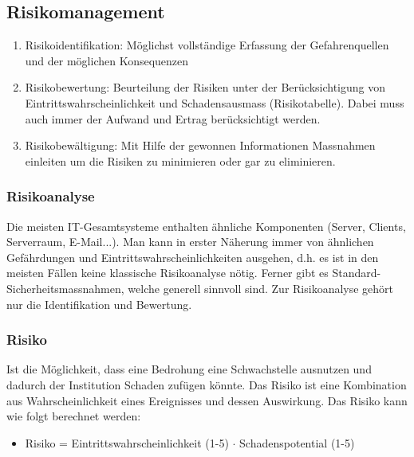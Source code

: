 \subsection{Risikomanagement}
\begin{enumerate}
	\item Risikoidentifikation: Möglichst vollständige Erfassung der Gefahrenquellen und der möglichen Konsequenzen
	\item Risikobewertung: Beurteilung der Risiken unter der Berücksichtigung von Eintrittswahrscheinlichkeit und Schadensausmass (Risikotabelle). Dabei muss auch immer der Aufwand und Ertrag berücksichtigt werden.
	\item Risikobewältigung: Mit Hilfe der gewonnen Informationen Massnahmen einleiten um die Risiken zu minimieren oder gar zu eliminieren.
\end{enumerate}

\subsubsection{Risikoanalyse}
Die meisten IT-Gesamtsysteme enthalten ähnliche Komponenten (Server, Clients, Serverraum, E-Mail...). Man kann in erster Näherung immer von ähnlichen Gefährdungen und Eintrittswahrscheinlichkeiten ausgehen, d.h. es ist in den meisten Fällen keine klassische Risikoanalyse nötig. Ferner gibt es Standard-Sicherheitsmassnahmen, welche generell sinnvoll sind. Zur Risikoanalyse gehört nur die Identifikation und Bewertung.

\subsubsection{Risiko}
Ist die Möglichkeit, dass eine Bedrohung eine Schwachstelle
ausnutzen und dadurch der Institution Schaden zufügen könnte. Das Risiko ist eine Kombination aus Wahrscheinlichkeit eines Ereignisses und dessen Auswirkung. Das Risiko kann wie folgt berechnet werden:
\begin{itemize}
	\item Risiko = Eintrittswahrscheinlichkeit (1-5) $\cdot$ Schadenspotential (1-5)
\end{itemize}
